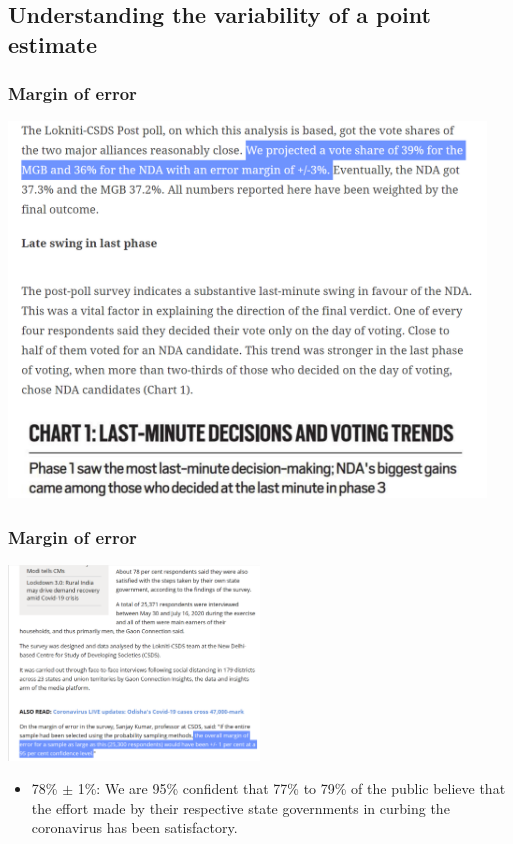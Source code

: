 \documentclass[notes,11pt, aspectratio=169]{beamer}
\begin{document}

\subsection{Understanding the variability of a point estimate}



\begin{frame}
\frametitle{Margin of error}

\begin{center}
\includegraphics[width=0.95\textwidth]{graphs/l05f01.png}
\end{center}
\end{frame}

\begin{frame}
\frametitle{Margin of error}

\begin{center}
\includegraphics[width=0.5\textwidth]{graphs/l05f02.png}
\end{center}

\begin{itemize}
\item 78\% $\pm$ 1\%: We are 95\% confident that 77\% to 79\% of the public believe that the effort made by their respective state governments in curbing the coronavirus has been satisfactory.
\end{itemize}
\end{frame}
\end{document}
